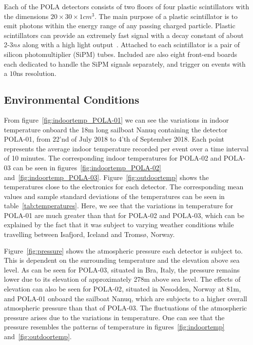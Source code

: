 \documentclass[12pt,a4paper]{amsart}
\begin{document}
Each of the POLA detectors consists of two floors of four plastic scintillators with the dimensions $20\times30\times1 \si{cm}^3$. The main purpose of a plastic scintillator is to emit photons within the energy range of any passing charged particle. Plastic scintillators can provide an extremely fast signal with a decay constant of about 2-3$\si{ns}$ along with a high light output~\cite{leo1994}. Attached to each scintillator is a pair of silicon photomultiplier (SiPM) tubes. Included are also eight front-end boards each dedicated to handle the SiPM signals separately, and trigger on events with a $10$ns resolution.

\setcounter{section}{3}
\setcounter{subsection}{0}
\subsection{Environmental Conditions}
From figure~\ref{fig:indoortemp_POLA-01} we can see the variations in indoor temperature onboard the 18m long sailboat Nanuq containing the detector POLA-01, from 22'nd of July 2018 to 4'th of September 2018. Each point represents the average indoor temperature recorded per event over a time interval of 10 minutes. The corresponding indoor temperatures for POLA-02 and POLA-03 can be seen in figures~\ref{fig:indoortemp_POLA-02} and~\ref{fig:indoortemp_POLA-03}. Figure~\ref{fig:outdoortemp} shows the temperatures close to the electronics for each detector. The corresponding mean values and sample standard deviations of the temperatures can be seen in table~\ref{tab:temperatures}. Here, we see that the variations in temperature for POLA-01 are much greater than that for POLA-02 and POLA-03, which can be explained by the fact that it was subject to varying weather conditions while travelling between Isafjord, Iceland and Tromsø, Norway.

Figure~\ref{fig:pressure} shows the atmospheric pressure each detector is subject to. This is dependent on the surrounding temperature and the elevation above sea level. As can be seen for POLA-03, situated in Bra, Italy, the pressure remains lower due to its elevation of approximately 278m above sea level. The effects of elevation can also be seen for POLA-02, situated in Nesodden, Norway at 81m, and POLA-01 onboard the sailboat Nanuq, which are subjects to a higher overall atmospheric pressure than that of POLA-03. The fluctuations of the atmospheric pressure arises due to the variations in temperature. One can see that the pressure resembles the patterns of temperature in figures~\ref{fig:indoortemp} and~\ref{fig:outdoortemp}.
\end{document}
